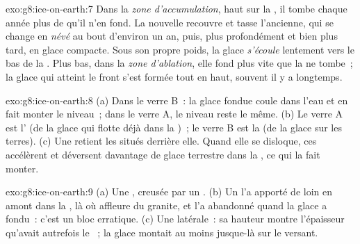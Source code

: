 \begin{solution}{exo:g8:ice-on-earth:7}
Dans la \emph{zone d'accumulation}, haut sur la , il tombe chaque
année plus de  qu'il n'en fond. La  nouvelle recouvre et tasse
l'ancienne, qui se change en \emph{névé} au bout d'environ un an, puis,
plus profondément et bien plus tard, en glace compacte. Sous son propre
poids, la glace \emph{s'écoule} lentement vers le bas de la . Plus
bas, dans la \emph{zone d'ablation}, elle fond plus vite que la  ne
tombe~; la glace qui atteint le front s'est formée tout en haut, souvent
il y a longtemps.
\end{solution}

\begin{solution}{exo:g8:ice-on-earth:8}
(a) Dans le verre B~: la glace fondue coule dans l'eau et en fait monter
le niveau~; dans le verre A, le niveau reste le même. (b) Le verre A est
l' (de la glace qui flotte déjà dans la )~; le verre B est la
 (de la glace sur les terres). (c) Une  retient les  situés derrière elle. Quand elle se disloque,
ces  accélèrent et déversent davantage de glace terrestre dans la
, ce qui la fait monter.
\end{solution}

\begin{solution}{exo:g8:ice-on-earth:9}
(a) Une , creusée par un . (b) Un  l'a apporté
de loin en amont dans la , là où affleure du granite, et l'a
abandonné quand la glace a fondu~: c'est un bloc erratique. (c) Une
 latérale~: sa hauteur montre l'épaisseur qu'avait autrefois le
~; la glace montait au moins jusque-là sur le versant.
\end{solution}

